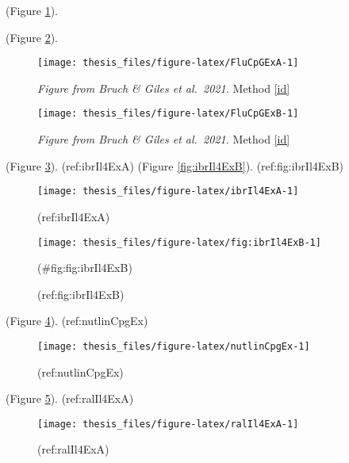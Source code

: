 \documentclass[11pt, a4paper, twosided]{book}
\begin{document}
(Figure \ref{fig:FluCpGExA}).



(Figure \ref{fig:FluCpGExB}).


\begin{figure}

{\centering \texttt{[image: thesis\_files/figure-latex/FluCpGExA-1]} 

}

\caption{\emph{Figure from Bruch \& Giles et al.~2021.} Method \ref{id}}\label{fig:FluCpGExA}
\end{figure}
\begin{figure}

{\centering \texttt{[image: thesis\_files/figure-latex/FluCpGExB-1]} 

}

\caption{\emph{Figure from Bruch \& Giles et al.~2021.} Method \ref{id}}\label{fig:FluCpGExB}
\end{figure}
(Figure \ref{fig:ibrIl4ExA}).
(ref:ibrIl4ExA)
(Figure \ref{fig:ibrIl4ExB}).
(ref:fig:ibrIl4ExB)
\begin{figure}

{\centering \texttt{[image: thesis\_files/figure-latex/ibrIl4ExA-1]} 

}

\caption{(ref:ibrIl4ExA)}\label{fig:ibrIl4ExA}
\end{figure}
\begin{figure}

{\centering \texttt{[image: thesis\_files/figure-latex/fig:ibrIl4ExB-1]} 

}

\caption{(ref:fig:ibrIl4ExB)}(\#fig:fig:ibrIl4ExB)
\end{figure}
(Figure \ref{fig:nutlinCpgEx}).
(ref:nutlinCpgEx)
\begin{figure}

{\centering \texttt{[image: thesis\_files/figure-latex/nutlinCpgEx-1]} 

}

\caption{(ref:nutlinCpgEx)}\label{fig:nutlinCpgEx}
\end{figure}
(Figure \ref{fig:ralIl4ExA}).
(ref:ralIl4ExA)
\begin{figure}

{\centering \texttt{[image: thesis\_files/figure-latex/ralIl4ExA-1]} 

}

\caption{(ref:ralIl4ExA)}\label{fig:ralIl4ExA}
\end{figure}
\end{document}
